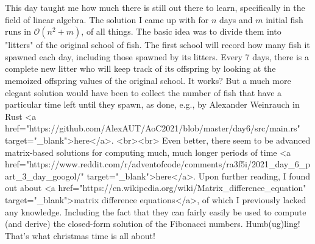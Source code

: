 This day taught me how much there is still out there to learn, specifically in the field of linear algebra. The solution I came up with for $n$ days and $m$ initial fish runs in $\mathcal{O}(n^2 + m)$, of all things. The basic idea was to divide them into "litters" of the original school of fish. The first school will record how many fish it spawned each day, including those spawned by its litters. Every 7 days, there is a complete new litter who will keep track of its offspring by looking at the memoized offspring values of the original school. It works? But a much more elegant solution would have been to collect the number of fish that have a particular time left until they spawn, as done, e.g., by Alexander Weinrauch in Rust <a href="https://github.com/AlexAUT/AoC2021/blob/master/day6/src/main.rs" target="_blank">here</a>. 
<br><br>
Even better, there seem to be advanced matrix-based solutions for computing much, much longer periods of time <a href="https://www.reddit.com/r/adventofcode/comments/ra3f5i/2021_day_6_part_3_day_googol/" target="_blank">here</a>. Upon further reading, I found out about <a href="https://en.wikipedia.org/wiki/Matrix_difference_equation" target="_blank">matrix difference equations</a>, of which I previously lacked any knowledge. Including the fact that they can fairly easily be used to compute (and derive) the closed-form solution of the Fibonacci numbers. Humb(ug)ling! That's what christmas time is all about! 🎄